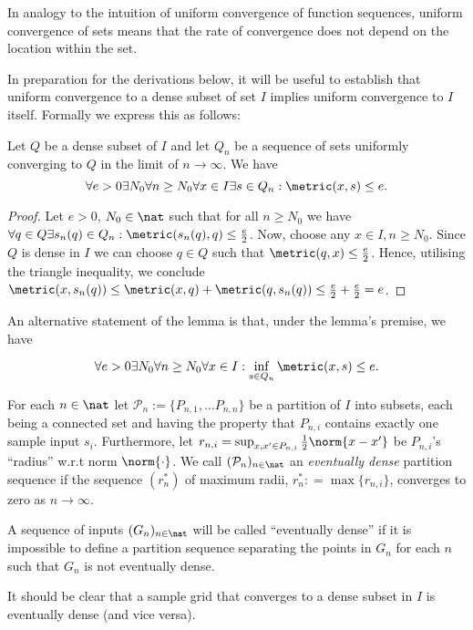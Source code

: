 In analogy to the intuition of uniform convergence of function sequences, uniform convergence of sets means that the rate of convergence does not depend on the location within the set.


In preparation for the derivations below, it will be useful to establish that uniform convergence to a dense subset of set $I$ implies uniform convergence to $I$ itself. Formally we express this as follows:

\begin{lem}
\label{lem:unifdenseset1}
Let $Q$ be a dense subset of $I$ and let $Q_n$ be a sequence of sets uniformly converging to $Q$ in the limit of $n \to \infty$. We have \[\forall e > 0 \exists N_0 \forall n \geq N_0 \forall x \in I \exists s \in Q_n: \metric(x,s) \leq e. \]


\begin{proof}
Let $e>0$, $N_0 \in \nat$ such that for all $n \geq N_0$ we have $\forall q \in Q \exists s_n(q) \in Q_n: \metric(s_n(q),q) \leq \frac{e}{2}$. 
Now, choose any $x \in I, n \geq N_0$. Since $Q$ is dense in $I$ we can choose $q \in Q$ such that $\metric(q,x) \leq \frac{e}{2}$. 
Hence, utilising the triangle inequality, we conclude $\metric(x,s_n(q)) \leq \metric(x,q) +\metric(q,s_n(q)) \leq \frac{e}{2} + \frac{e}{2} = e$.
\end{proof}
\end{lem}
An alternative statement of the lemma is that, under the lemma's premise, we have 

\[\forall e > 0 \exists N_0 \forall n \geq N_0 \forall x \in I : \inf_{s \in Q_n} \metric(x,s) \leq e. \]


\begin{defn} 
For each $n \in \nat$ let $\mathcal P_n :=\{P_{n,1},...P_{n,n}\}$ be a partition of $I$ into subsets, each being a connected set and having the property that $P_{n,i}$ contains exactly one sample input $s_i$. Furthermore, let $r_{n,i} = \sup_{x,x' \in P_{n,i}} \frac{1}{2} \norm{x-x'}$ be $ P_{n,i}$'s ``radius'' w.r.t norm $\norm{\cdot}$. 
We call $(\mathcal P_n)_{n \in \nat}$ an \emph{eventually dense} partition sequence if the sequence $(r^*_n)$ of maximum radii, $r^*_n : = \max \{ r_{n,i} \}$, converges to zero as $n \to \infty$.

A sequence of inputs $(G_n)_{n \in \nat}$ will be called ``eventually dense'' if it is impossible to define a partition sequence separating the points in $G_n$ for each $n$ such that $G_n$ is not eventually dense.
\end{defn}
It should be clear that a sample grid that converges to a dense subset in $I$ is eventually dense (and vice versa).


